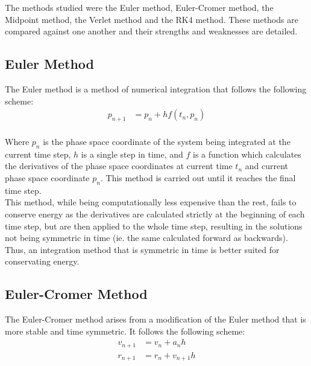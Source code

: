\documentclass[10pt,letterpaper]{article}
\begin{document}
The methods studied were the Euler method, Euler-Cromer method, the Midpoint method, the Verlet method and the RK4 method. These methods are compared against one another and their strengths and weaknesses are detailed. \\

\subsection{Euler Method}
The Euler method is a method of numerical integration that follows the following scheme:\\

\begin{equation}
\begin{split}
p_{n+1} & = p_n + h f(t_n, p_n)\\
\end{split}
\end{equation}\label{eqn:euler_method}

Where $p_n$ is the phase space coordinate of the system being integrated at the current time step, $h$ is a single step in time, and $f$ is a function which calculates the derivatives of the phase space coordinates at current time $t_n$ and current phase space coordinate $p_n$. This method is carried out until it reaches the final time step.\\

This method, while being computationally less expensive than the rest, fails to conserve energy as the derivatives are calculated strictly at the beginning of each time step, but are then applied to the whole time step, resulting in the solutions not being symmetric in time (ie. the same calculated forward as backwards). Thus, an integration method that is symmetric in time is better suited for conservating energy.\\

\subsection{Euler-Cromer Method}
The Euler-Cromer method arises from a modification of the Euler method that is more stable and time symmetric. It follows the following scheme:\\

\begin{equation}
\begin{split}
v_{n+1} & = v_n + a_n h\\
r_{n+1} & = r_n + v_{n+1} h\\
\end{split}
\end{equation}\label{eqn:euler_cromer_method}
\end{document}
